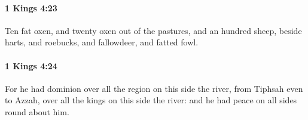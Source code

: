 		\paragraph{1 Kings 4:23} %
			\label{1KINGS-4-23}

			Ten fat oxen, and twenty oxen out of the pastures, and an hundred sheep, beside harts, and roebucks, and fallowdeer, and fatted fowl.


		\paragraph{1 Kings 4:24} %
			\label{1KINGS-4-24}

			For he had dominion over all the region on this side the river, from Tiphsah even to Azzah, over all the kings on this side the river: and he had peace on all sides round about him.


